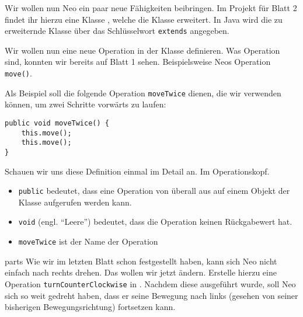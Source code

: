 
    Wir wollen nun Neo ein paar neue Fähigkeiten beibringen.
    Im Projekt für Blatt 2 findet ihr hierzu eine Klasse \ownclass{},
    welche die Klasse \superclass{}  erweitert. In Java wird die zu erweiternde Klasse über das Schlüsselwort \lstinline{extends} angegeben.

    Wir wollen nun eine neue Operation in der Klasse \ownclass{} definieren. Was Operation sind, konnten wir bereits auf Blatt 1 sehen. Beispielsweise Neos Operation \lstinline{move()}.

    Als Beispiel soll die folgende Operation \texttt{moveTwice} dienen, die wir verwenden können, um zwei Schritte vorwärts zu laufen:
    \begin{lstlisting}
public void moveTwice() {
    this.move();
    this.move();
}
    \end{lstlisting}
    Schauen wir uns diese Definition einmal im Detail an. Im Operationskopf.
    \begin{itemize}
    \item \lstinline{public} bedeutet, dass eine Operation von überall aus auf einem Objekt der Klasse aufgerufen werden kann.
    \item \lstinline{void} (engl. ``Leere'') bedeutet, dass die Operation keinen Rückgabewert hat.
    \item \lstinline{moveTwice} ist der Name der Operation
    \end{itemize}

    \subexcercise parts
    Wie wir im letzten Blatt schon festgestellt haben, kann sich Neo nicht einfach nach rechts drehen. Das wollen wir jetzt ändern.
    Erstelle hierzu eine Operation \lstinline{turnCounterClockwise} in \ownclass. Nachdem diese ausgeführt wurde, soll Neo sich so weit gedreht haben, dass er seine Bewegung nach links (gesehen von seiner bisherigen Bewegungsrichtung) fortsetzen kann.


